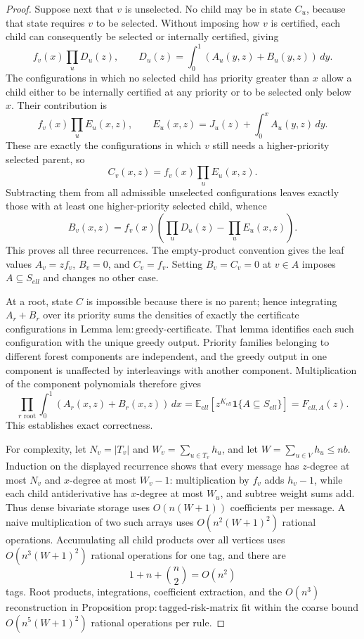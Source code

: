 \documentclass{article}
\begin{document}
\begin{proof}
Suppose next that \(v\) is unselected.  No child may be in state \(C_u\), because that state requires \(v\) to be selected.  Without imposing how \(v\) is certified, each child can consequently be selected or internally certified, giving
\[
 f_v(x)\prod_uD_u(z),
 \qquad
 D_u(z)=\int_0^1(A_u(y,z)+B_u(y,z))\,dy.
\]
The configurations in which no selected child has priority greater than \(x\) allow a child either to be internally certified at any priority or to be selected only below \(x\).  Their contribution is
\[
 f_v(x)\prod_uE_u(x,z),
 \qquad
 E_u(x,z)=J_u(z)+\int_0^xA_u(y,z)\,dy.
\]
These are exactly the configurations in which \(v\) still needs a higher-priority selected parent, so
\[
 C_v(x,z)=f_v(x)\prod_uE_u(x,z).
\]
Subtracting them from all admissible unselected configurations leaves exactly those with at least one higher-priority selected child, whence
\[
 B_v(x,z)=f_v(x)\left(\prod_uD_u(z)-\prod_uE_u(x,z)\right).
\]
This proves all three recurrences.  The empty-product convention gives the leaf values \(A_v=zf_v\), \(B_v=0\), and \(C_v=f_v\).  Setting \(B_v=C_v=0\) at \(v\in A\) imposes \(A\subseteq S_{ell}\) and changes no other case.

At a root, state \(C\) is impossible because there is no parent; hence integrating \(A_r+B_r\) over its priority sums the densities of exactly the certificate configurations in Lemma \(\mathrm{lem:greedy\mbox{-}certificate}\).  That lemma identifies each such configuration with the unique greedy output.  Priority families belonging to different forest components are independent, and the greedy output in one component is unaffected by interleavings with another component.  Multiplication of the component polynomials therefore gives
\[
 \prod_{r\text{ root}}\int_0^1(A_r(x,z)+B_r(x,z))\,dx
 =\mathbb E_{ell}[z^{K_{ell}}\mathbf 1\{A\subseteq S_{ell}\}]
 =F_{ell,A}(z).
\]
This establishes exact correctness.

For complexity, let \(N_v=|T_v|\) and \(W_v=\sum_{u\in T_v}h_u\), and let \(W=\sum_{u\in V}h_u\le nb\).  Induction on the displayed recurrence shows that every message has \(z\)-degree at most \(N_v\) and \(x\)-degree at most \(W_v-1\): multiplication by \(f_v\) adds \(h_v-1\), while each child antiderivative has \(x\)-degree at most \(W_u\), and subtree weight sums add.  Thus dense bivariate storage uses \(O(n(W+1))\) coefficients per message.  A naive multiplication of two such arrays uses \(O(n^2(W+1)^2)\) rational operations.  Accumulating all child products over all vertices uses \(O(n^3(W+1)^2)\) rational operations for one tag, and there are
\[
 1+n+\binom n2=O(n^2)
\]
tags.  Root products, integrations, coefficient extraction, and the \(O(n^3)\) reconstruction in Proposition \(\mathrm{prop:tagged\mbox{-}risk\mbox{-}matrix}\) fit within the coarse bound \(O(n^5(W+1)^2)\) rational operations per rule.


\end{proof}
\end{document}

